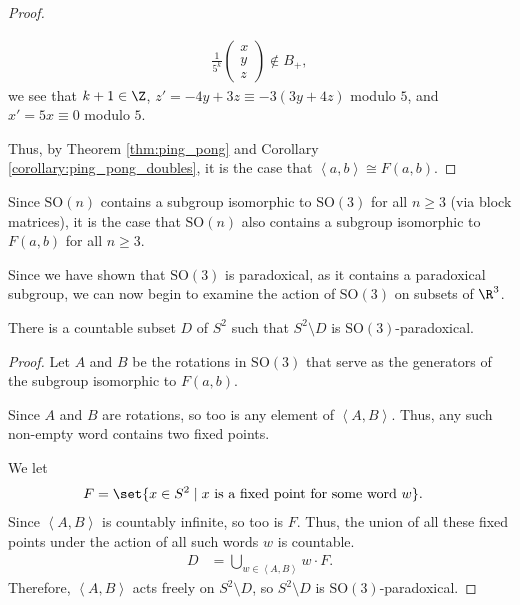 \documentclass[10pt]{mypackage2}
\begin{document}
\begin{proof}
\begin{enumerate}[(1)]
      \begin{align*}
        \frac{1}{5^{k}} \begin{pmatrix}x\\y\\z\end{pmatrix}\notin B_{+},
      \end{align*}
      we see that $k+1\in \Z$, $z' = -4y + 3z \equiv -3\left(3y + 4z\right)$ modulo $5$, and $x' = 5x \equiv 0$ modulo $5$.
  \end{enumerate}
  Thus, by Theorem \ref{thm:ping_pong} and Corollary \ref{corollary:ping_pong_doubles}, it is the case that $\left\langle a,b \right\rangle\cong F(a,b)$.
\end{proof}
\begin{remark}
  Since $\text{SO}(n)$ contains a subgroup isomorphic to $\text{SO}(3)$ for all $n\geq 3$ (via block matrices), it is the case that $\text{SO}(n)$ also contains a subgroup isomorphic to $F(a,b)$ for all $n\geq 3$.
\end{remark}
Since we have shown that $\text{SO}(3)$ is paradoxical, as it contains a paradoxical subgroup, we can now begin to examine the action of $\text{SO}(3)$ on subsets of $\R^3$.
\begin{theorem}
  There is a countable subset $D$ of $S^{2}$ such that $S^{2}\setminus D$ is $\text{SO}(3)$-paradoxical.
\end{theorem}
\begin{proof}
  Let $A$ and $B$ be the rotations in $\text{SO}(3)$ that serve as the generators of the subgroup isomorphic to $F(a,b)$.\newline

  Since $A$ and $B$ are rotations, so too is any element of $\left\langle A,B \right\rangle$. Thus, any such non-empty word contains two fixed points.\newline

  We let
  \begin{align*}
    F &= \set{x\in S^{2}\mid x\text{ is a fixed point for some word }w}.
  \end{align*}
  Since $\left\langle A,B \right\rangle$ is countably infinite, so too is $F$. Thus, the union of all these fixed points under the action of all such words $w$ is countable.
  \begin{align*}
    D &= \bigcup_{w\in \left\langle A,B \right\rangle} w\cdot F.
  \end{align*}
  Therefore, $\left\langle A,B \right\rangle$ acts freely on $S^{2}\setminus D$, so $S^{2}\setminus D$ is $\text{SO}(3)$-paradoxical.
\end{proof}
\end{document}
